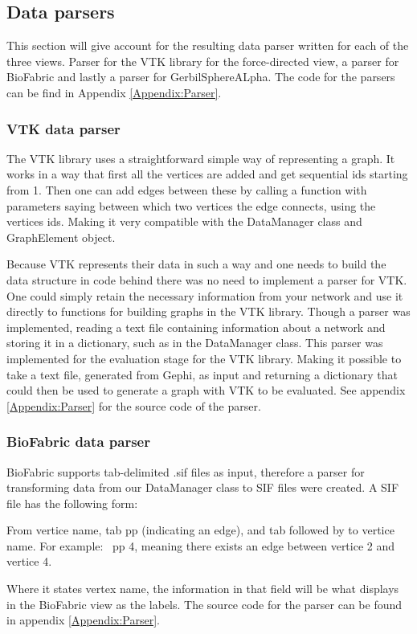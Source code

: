 \documentclass[a4paper,11pt]{kth-mag}
\begin{document}
\begin{appendices}
\subsection{Data parsers}
\label{Data:Parsers}
This section will give account for the resulting data parser written for each of the three views. Parser for the VTK library for the force-directed view, a parser for BioFabric and lastly a parser for GerbilSphereALpha.
 The code for the parsers can be find in Appendix \ref{Appendix:Parser}.
\label{section-parsers}
\subsubsection{VTK data parser}
The VTK library uses a straightforward simple way of representing a graph. It works in a way that first all the vertices are added and get sequential ids starting from 1. Then one can add edges between these by calling a function with parameters
saying between which two vertices the edge connects, using the vertices ids. Making it very compatible with the DataManager class and GraphElement object.

Because VTK represents their data in such a way and one needs to build the data structure in code behind there was no need to implement a parser for VTK. One could simply retain the necessary information from your network
 and use it directly to functions for building graphs in the VTK library. Though a parser was implemented, reading a text file containing information about a network and storing it in a
 dictionary, such as in the DataManager class. This parser was implemented for the evaluation stage for the VTK library. Making it possible to take a text file, generated from Gephi, as input and returning a 
 dictionary that could then be used to generate a graph with VTK to be evaluated. See appendix \ref{Appendix:Parser} for the source code of the parser.
\subsubsection{BioFabric data parser}
BioFabric supports tab-delimited .sif files \cite{website:biosif} as input, therefore a parser for transforming data from our DataManager class to SIF files were created. A SIF file has the following form:\
\newline
\begin{itemize}
 From vertice name, tab pp (indicating an edge), and tab followed by to vertice name. For example:\
 \newline
 2	pp	4,
\newline
 meaning there exists an edge between vertice 2 and vertice 4.
 \end{itemize}
 \newline
 Where it states vertex name, the information in that field will be what displays in the BioFabric view as the labels. The source code for the parser can be found in appendix \ref{Appendix:Parser}.

\end{appendices}
\end{document}

